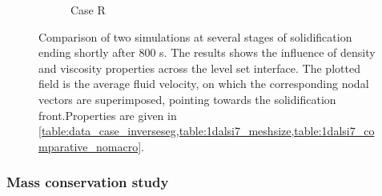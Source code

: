 \begin{figure}[htbp]
\begin{subfigure}{0.55\textwidth}
	\caption{Case R}
    \label{fig:1dalsi7_differentprops}
  \end{subfigure}
\caption{Comparison of two simulations at several stages of solidification ending shortly after 800 s.
The results shows the influence of density and viscosity properties across the level set interface.
The plotted field is the average fluid velocity, on which the corresponding nodal vectors are superimposed, pointing
towards the solidification front.Properties are given in \cref{table:data_case_inverseseg,table:1dalsi7_meshsize,table:1dalsi7_comparative_nomacro}.}
\label{fig:1dalsi7_caseA1R}
\end{figure}

\subsubsection{Mass conservation study}

